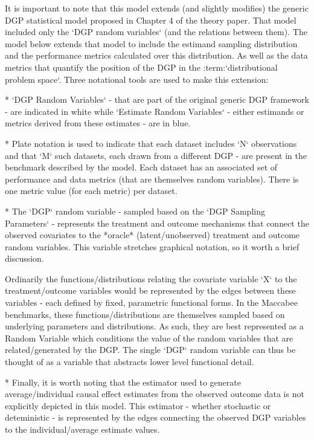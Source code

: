\documentclass[../main.tex]{subfiles}
\begin{document}
It is important to note that this model extends (and slightly modifies) the generic DGP statistical model proposed in Chapter 4 of the theory paper. That model included only the `DGP random variables` (and the relations between them). The model below extends that model to include the estimand sampling distribution and the performance metrics calculated over this distribution. As well as the data metrics that quantify the position of the DGP in the :term:`distributional problem space`. Three notational tools are used to make this extension:

* `DGP Random Variables` - that are part of the original generic DGP framework - are indicated in white while `Estimate Random Variables` - either estimands or metrics derived from these estimates - are in blue.

* Plate notation is used to indicate that each dataset includes `N` observations and that `M` such datasets, each drawn from a different DGP - are present in the benchmark described by the model. Each dataset has an associated set of performance and data metrics (that are themselves random variables). There is one metric value (for each metric) per dataset.

* The `DGP` random variable - sampled based on the `DGP Sampling Parameters` - represents the treatment and outcome mechanisms that connect the observed covariates to the *oracle* (latent/unobserved) treatment and outcome random variables. This variable stretches graphical notation, so it worth a brief discussion.

  Ordinarily the functions/distributions relating the covariate variable `X` to the treatment/outcome variables would be represented by the edges between these variables - each defined by fixed, parametric functional forms. In the Maccabee benchmarks, these functions/distributions are themselves sampled based on underlying parameters and distributions. As such, they are best represented as a Random Variable which conditions the value of the random variables that are related/generated by the DGP. The single `DGP` random variable can thus be thought of as a variable that abstracts lower level functional detail.

* Finally, it is worth noting that the estimator used to generate average/individual causal effect estimates from the observed outcome data is not explicitly depicted in this model. This estimator - whether stochastic or deteministic - is represented by the edges connecting the observed DGP variables to the individual/average estimate values.
\end{document}

